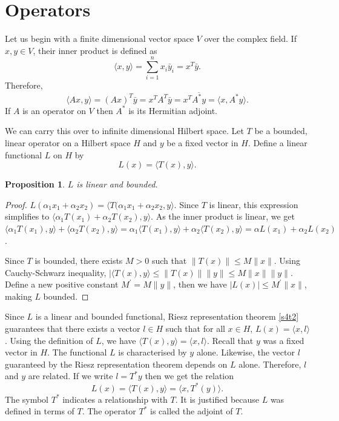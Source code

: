 \documentclass{article}
\theoremstyle{plain}
\numberwithin{thm}{section}
\theoremstyle{plain}
\newtheorem{prop}{Proposition}
\numberwithin{prop}{section}
\theoremstyle{definition}
\numberwithin{defn}{section}
\theoremstyle{remark}
\numberwithin{equation}{section}
\begin{document}
\section{Operators}\label{s5}
Let us begin with a finite dimensional vector space $V$ over the complex field.
If $x, y \in V$, their inner product is defined as 
\[
\langle x, y\rangle = \sum_{i=1}^n x_i\bar{y}_i = x^T \bar{y}.
\]
Therefore,
\[
\langle Ax, y\rangle = (Ax)^T\bar{y} = x^T A^T\bar{y} = x^T\overline{A^\ast y}=
\langle x, A^\ast y\rangle.
\]
If $A$ is an operator on $V$ then $A^\ast$ is its Hermitian adjoint.

We can carry this over to infinite dimensional Hilbert space. Let $T$ be a 
bounded, linear operator on a Hilbert space $H$ and $y$ be a fixed vector in 
$H$. Define a linear functional $L$ on $H$ by
\[
L(x) = \langle T(x), y\rangle.
\]
\begin{prop}\label{s5p1}
$L$ is linear and bounded.
\end{prop}
\begin{proof}
$L(\alpha_1 x_1 + \alpha_2 x_2) = \langle T(\alpha_1 x_1 + \alpha_2 x_2, y
\rangle$. Since $T$ is linear, this expression simplifies to $\langle \alpha_1
T(x_1) + \alpha_2 T(x_2), y\rangle$. As the inner product is linear, we get 
$\langle \alpha_1 T(x_1), y\rangle + \langle \alpha_2 T(x_2), y\rangle = 
\alpha_1 \langle T(x_1), y\rangle + \alpha_2\langle T(x_2), y\rangle = 
\alpha L(x_1) + \alpha_2 L(x_2)$.

Since $T$ is bounded, there exists $M > 0$ such that $\lVert T(x) \rVert \le
M\lVert x \rVert$. Using Cauchy-Schwarz inequality, $|\langle T(x), y\rangle \le
\lVert T(x) \rVert\lVert y \rVert \le M\lVert x \rVert\lVert y \rVert$. Define a
new positive constant $M^\prime = M\lVert y \rVert$, then we have $|L(x)| \le
M^\prime\lVert x \rVert$, making $L$ bounded.
\end{proof}

Since $L$ is a linear and bounded functional, Riesz representation theorem
\ref{s4t2} guarantees that there exists a vector $l \in H$ such that for all
$x \in H$, $L(x) = \langle x, l\rangle$. Using the definition of $L$, we have
$\langle T(x), y\rangle = \langle x, l\rangle$. Recall that $y$ was a fixed
vector in $H$. The functional $L$ is characterised by $y$ alone. Likewise, the
vector $l$ guaranteed by the Riesz representation theorem depends on $L$ alone.
Therefore, $l$ and $y$ are related. If we write $l = T^\ast y$ then we get the
relation
\[
L(x) = \langle T(x), y\rangle = \langle x, T^\ast(y)\rangle.
\]
The symbol $T^\ast$ indicates a relationship with $T$. It is justified because
$L$ was defined in terms of $T$. The operator $T^\ast$ is called the adjoint of 
$T$.
\end{document}
